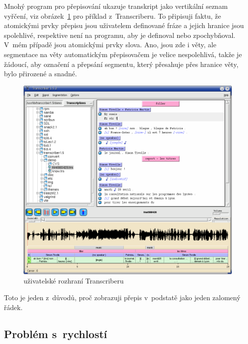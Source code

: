 Mnohý program pro přepisování ukazuje transkript jako vertikální seznam vyřčení,
viz obrázek~\ref{fig:transcriber} pro příklad z~Transcriberu. To připisuji faktu,
že atomickými prvky přepisu jsou uživatelem definované fráze a jejich hranice
jsou spolehlivé, respektive není na programu, aby je definoval nebo
zpochybňoval. V~mém případě jsou atomickými prvky slova. Ano, jsou zde i věty,
ale segmentace na věty automatickým přepisovačem je velice nespolehlivá, takže
je žádoucí, aby označení a přepsání segmentu, který přesahuje přes hranice věty,
bylo přirozené a snadné.

\begin{figure}[htpb]
\includegraphics[scale=0.46]{rc/transcriber1.png}
\caption{uživatelské rozhraní Transcriberu}
\label{fig:transcriber}
\end{figure}

Toto je jeden z~důvodů, proč zobrazuji přepis v~podstatě jako jeden zalomený
řádek.

\subsection{Problém s~rychlostí}

